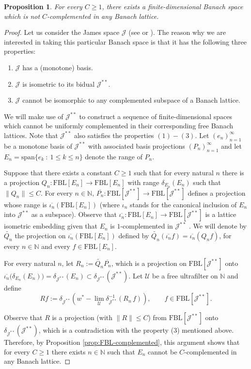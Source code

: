 \documentclass[11pt]{amsart}
\newtheorem{prop}[thm]{Proposition}
\theoremstyle{definition}
\numberwithin{equation}{section}
\newcommand{\fbl}{\text{FBL}}
\begin{document}
\begin{prop}
For every $C\geq 1$, there exists a finite-dimensional Banach space which is not $C$-complemented in any Banach lattice.
\end{prop}
\begin{proof}
Let us consider the James space $\mathcal{J}$ (see \cite{J51} or \cite[Section 3.4]{AK-book}). The reason why we are interested in taking this particular Banach space is that it has the following three properties:
\begin{enumerate}
    \item $\mathcal{J}$ has a (monotone) basis.
    \item $\mathcal{J}$ is isometric to its bidual $\mathcal{J}^{**}$.
    \item $\mathcal{J}$ cannot be isomorphic to any complemented subspace of a Banach lattice.
\end{enumerate}

We will make use of $\mathcal{J}^{**}$ to construct a sequence of finite-dimensional spaces which cannot be uniformly complemented in their corresponding free Banach lattices. Note that $\mathcal{J}^{**}$ also satisfies the properties $(1)-(3)$. Let $(e_n)_{n=1}^\infty$ be a monotone basis of $\mathcal{J}^{**}$ with associated basis projections $(P_n)_{n=1}^\infty$ and let $E_n=\text{span}\{e_k\::\: 1\leq k\leq n\}$ denote the range of $P_n$.


 Suppose that there exists a constant $C\geq 1$ such that for every natural $n$ there is a projection $Q_n:\fbl[E_n]\to\fbl[E_n]$ with range $\delta_{E_n}(E_n)$ such that $\|Q_n\|\leq C$. For every $n\in\mathbb{N}$, $\overline{P_n}:\fbl[\mathcal{J}^{**}]\to \fbl[\mathcal{J}^{**}]$ defines a projection whose range is $\overline{\iota_n}(\fbl[E_n])$ (where $\iota_n$ stands for the canonical inclusion of $E_n$ into $\mathcal{J}^{**}$ as a subspace). Observe that $\overline{\iota_n}:\fbl[E_n]\to \fbl[\mathcal{J}^{**}]$ is a lattice isometric embedding given that $E_n$ is $1$-complemented in $\mathcal{J}^{**}$ \cite[Theorem 3.7]{OTTT24}. We will denote by $\widetilde{Q_n}$ the projection on $\overline{\iota_n}(\fbl[E_n])$ defined by $\widetilde{Q_n}(\overline{\iota_n}f)=\overline{\iota_n}(Q_n f)$, for every $n\in\mathbb{N}$ and every $f\in \fbl[E_n]$.

For every natural $n$, let $R_n:=\widetilde{Q_n}\overline{P_n}$, which is a projection on $\fbl[\mathcal{J}^{**}]$ onto $\overline{\iota_n}\bigl(\delta_{E_n}(E_n)\bigr)=\delta_{\mathcal{J}^{**}}(E_n)\subset \delta_{\mathcal{J}^{**}}(\mathcal{J}^{**})$. Let $\mathcal{U}$ be a free ultrafilter on $\mathbb N$ and define
$$Rf:=\delta_{\mathcal{J}^{**}}\left(w^*-\lim_{\mathcal{U}} \delta_{\mathcal{J}^{**}}^{-1} (R_n\,f)\right),\qquad f\in \fbl[\mathcal{J}^{**}].$$

Observe that $R$ is a projection (with $\|R\|\leq C$) from $\fbl[\mathcal{J}^{**}]$
onto $\delta_{\mathcal{J}^{**}}(\mathcal{J}^{**})$, which is a contradiction with the property ($3$) mentioned above. Therefore, by Proposition \ref{prop:FBL-complemented}, this argument shows that for every $C\geq 1$ there exists $n\in\mathbb{N}$ such that $E_n$ cannot be $C$-complemented in any Banach lattice.
\end{proof}
\end{document}
